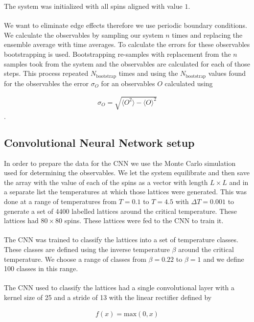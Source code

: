 \documentclass[10 pt, a4paper]{article}
\begin{document}
The system was initialized with all spins aligned with value $1$.
\\
\\
We want to eliminate edge effects therefore we use periodic boundary conditions. We calculate the observables by sampling our system $n$ times and replacing the ensemble average with time averages. To calculate the errors for these observables bootstrapping is used. Bootstrapping re-samples with replacement from the $n$ samples took from the system and the observables are calculated for each of those steps. This process repeated $N_{\mathrm{bootstrap}}$ times and using the $N_{\mathrm{bootstrap}}$ values found for the observables the error $\sigma_O$ for an observables $O$ calculated using

\begin{align*}
\sigma_O = \sqrt{\langle O ^2 \rangle - \langle O \rangle ^2}
\end{align*}.



\subsection{Convolutional Neural Network setup}


In order to prepare the data for the CNN we use the Monte Carlo simulation used for determining the observables. We let the system equilibrate and then save the array with the value of each of the spins as a vector with length $L \times L$ and in a separate list the temperatures at which those lattices were generated. This was done at a range of temperatures from $T = 0.1$ to $T = 4.5$ with $\Delta T = 0.001$ to generate a set of 4400 labelled lattices around the critical temperature. These lattices had $80 \times 80$ spins. These lattices were fed to the CNN to train it.  
\\
\\
The CNN was trained to classify the lattices into a set of temperature classes. These classes are defined using the inverse temperature $\beta$ around the critical temperature. We choose a range of classes from $\beta = 0.22$ to $\beta = 1$ and we define 100 classes in this range.
\\
\\
The CNN used to classify the lattices had a single convolutional layer with a kernel size of 25 and a stride of 13 with the linear rectifier defined by

\begin{align}
f(x) = \mathrm{max}(0,x)
\end{align}
\end{document}
